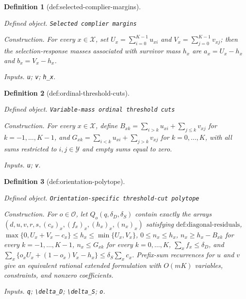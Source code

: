 \documentclass{article}
\newtheorem{definition}{Definition}
\begin{document}
\begin{definition}[def:selected-complier-margins]\label{def:selected-complier-margins}
\par\smallskip\noindent\emph{Defined object.} \texttt{Selected complier margins}
\par\smallskip\noindent\emph{Construction.} For every \(x\in\mathcal X\), set \(U_x=\sum_{i=0}^{K-1}u_{xi}\) and \(V_x=\sum_{j=0}^{K-1}v_{xj}\); then the selection-response masses associated with survivor mass \(h_x\) are \(a_x=U_x-h_x\) and \(b_x=V_x-h_x\).
\par\smallskip\noindent\emph{Inputs.} \texttt{u}; \texttt{v}; \texttt{h\_\allowbreak{}x}.
\end{definition}

\begin{definition}[def:ordinal-threshold-cuts]\label{def:ordinal-threshold-cuts}
\par\smallskip\noindent\emph{Defined object.} \texttt{Variable-\allowbreak{}mass ordinal threshold cuts}
\par\smallskip\noindent\emph{Construction.} For every \(x\in\mathcal X\), define \(B_{xk}=\sum_{i>k}u_{xi}+\sum_{j\le k}v_{xj}\) for \(k=-1,\ldots,K-1\), and \(G_{xk}=\sum_{i<k}u_{xi}+\sum_{j>k}v_{xj}\) for \(k=0,\ldots,K\), with all sums restricted to \(i,j\in\mathcal Y\) and empty sums equal to zero.
\par\smallskip\noindent\emph{Inputs.} \texttt{u}; \texttt{v}.
\end{definition}

\begin{definition}[def:orientation-polytope]\label{def:orientation-polytope}
\par\smallskip\noindent\emph{Defined object.} \texttt{Orientation-\allowbreak{}specific threshold-\allowbreak{}cut polytope}
\par\smallskip\noindent\emph{Construction.} For \(o\in\mathcal O\), let \(Q_o(q,\delta_D,\delta_S)\) contain exactly the arrays \((d,u,v,r,s,(c_x)_x,(f_x)_x,(h_x)_x,(n_x)_x)\) satisfying \(\text{def:diagonal-residuals}\), \(\max\{0,U_x+V_x-c_x\}\le h_x\le\min\{U_x,V_x\}\), \(0\le n_x\le h_x\), \(n_x\ge h_x-B_{xk}\) for every \(k=-1,\ldots,K-1\), \(n_x\le G_{xk}\) for every \(k=0,\ldots,K\), \(\sum_x f_x\le\delta_D\), and \(\sum_x\{o_xU_x+(1-o_x)V_x-h_x\}\le\delta_S\sum_x c_x\). Prefix-sum recurrences for \(u\) and \(v\) give an equivalent rational extended formulation with \(O(mK)\) variables, constraints, and nonzero coefficients.
\par\smallskip\noindent\emph{Inputs.} \texttt{q}; \texttt{\textbackslash{}\allowbreak{}delta\_\allowbreak{}D}; \texttt{\textbackslash{}\allowbreak{}delta\_\allowbreak{}S}; \texttt{o}.
\end{definition}
\end{document}
